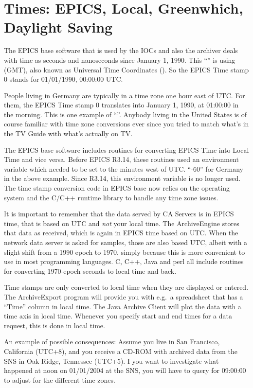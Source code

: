 \section{Times: EPICS, Local, Greenwhich, Daylight Saving} \label{sec:GMT}
The EPICS base software that is used by the IOCs and also the archiver
deals with time as seconds and nanoseconds since January 1, 1990.  This
``'' is using  (GMT),
also known as Universal Time Coordinates ().  So the EPICS
Time stamp 0 stands for 01/01/1990, 00:00:00 UTC.

People living in Germany are typically in a time zone one hour east of
UTC. For them, the EPICS Time stamp 0 translates into January 1, 1990,
at 01:00:00 in the morning. This is one example of ``''. Anybody living in the United States is of course familiar
with time zone conversions ever since you tried to match what's in the
TV Guide with what's actually on TV.

The EPICS base software includes routines for converting EPICS Time
into Local Time and vice versa. Before EPICS R3.14, these routines
used an environment variable  which needed
to be set to the minutes west of UTC. ``-60'' for Germany in the above
example. Since R3.14, this environment variable is no longer
used. The time stamp conversion code in EPICS base now relies on the
operating system and the C/C++ runtime library to handle any time zone
issues.

It is important to remember that the data served by CA Servers is in
EPICS time, that is based on UTC and \emph{not} your local time.  The
ArchiveEngine stores that data as received, which is again in EPICS
time based on UTC.  When the network data server is asked for samples,
those are also based UTC, albeit with a slight shift from a 1990 epoch
to 1970, simply because this is more convenient to use in most
programming languages. C, C++, Java and perl all include routines for
converting 1970-epoch seconds to local time and back.

Time stamps are only converted to local time when they are displayed
or entered.  The ArchiveExport program will provide you with e.g.\ a
spreadsheet that has a ``Time'' column in local time. The Java Archive
Client will plot the data with a time axis in local time. Whenever you
specify start and end times for a data request, this is done in local
time.

An example of possible consequences: Assume you live in San Francisco,
California (UTC+8), and you receive a CD-ROM with archived data from the SNS
in Oak Ridge, Tennessee (UTC+5). I you want to investigate what happened
at noon on 01/01/2004 at the SNS, you will have to query for
09:00:00 to adjust for the different time zones.

